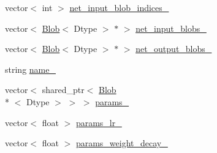 \begin{DoxyCompactItemize}
vector$<$ int $>$ \hyperlink{classcaffe_1_1_net_a083a9a4c3919721c833b53d5571a7400}{net\+\_\+input\+\_\+blob\+\_\+indices\+\_\+}
\item 
vector$<$ \hyperlink{classcaffe_1_1_blob}{Blob}$<$ Dtype $>$ $\ast$ $>$ \hyperlink{classcaffe_1_1_net_aeed682088cd2252f8402cb7b169d4f39}{net\+\_\+input\+\_\+blobs\+\_\+}
\item 
vector$<$ \hyperlink{classcaffe_1_1_blob}{Blob}$<$ Dtype $>$ $\ast$ $>$ \hyperlink{classcaffe_1_1_net_abbcd68a31a7ddc67dcac789fe880da23}{net\+\_\+output\+\_\+blobs\+\_\+}
\item 
string \hyperlink{classcaffe_1_1_net_aef7021f31e355ab8f8991755125f6b2b}{name\+\_\+}
\item 
vector$<$ shared\+\_\+ptr$<$ \hyperlink{classcaffe_1_1_blob}{Blob}\\*
$<$ Dtype $>$ $>$ $>$ \hyperlink{classcaffe_1_1_net_accf52332675952dd27dfc8d3c27fa583}{params\+\_\+}
\item 
vector$<$ float $>$ \hyperlink{classcaffe_1_1_net_aeb1f85c97372f57336e4e1af3eb7b9db}{params\+\_\+lr\+\_\+}
\item 
vector$<$ float $>$ \hyperlink{classcaffe_1_1_net_ad337cf5b16e69533f605dbe1f6932bc9}{params\+\_\+weight\+\_\+decay\+\_\+}
\end{DoxyCompactItemize}


